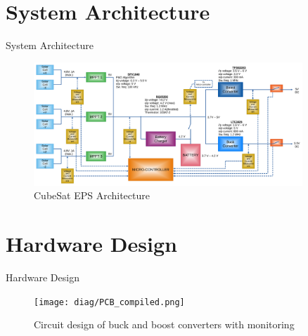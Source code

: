 \documentclass[aspectratio=169]{beamer}
\begin{document}
		
			
		
			
		
	
	
	
	\section{System Architecture}
	\begin{frame}{System Architecture}
		\begin{figure}[h]
			\centering
			\includegraphics[width=0.9\textwidth]{diag1 with specs.pdf}
			\caption{CubeSat EPS Architecture}
			\label{fig:mesh1}
		\end{figure}
		
		
	\end{frame}
	
	\section{Hardware Design}
	\begin{frame}{Hardware Design}
		\begin{figure}[h]
			\centering
			\texttt{[image: diag/PCB\_compiled.png]}
			\caption{Circuit design of buck and boost converters with monitoring}
			\label{fig:bubo}
		\end{figure}
	\end{frame}
	
\end{document}

